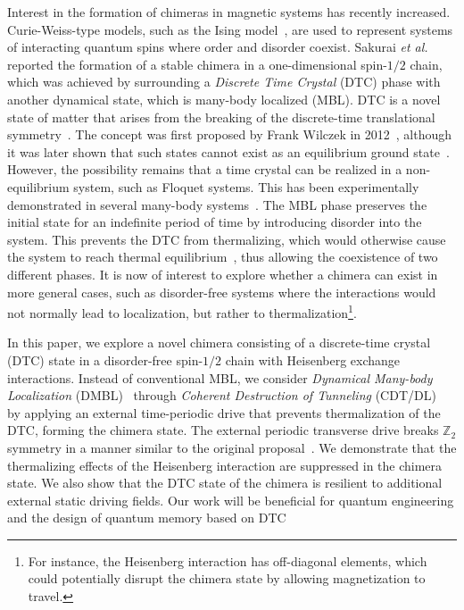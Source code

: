 \documentclass[12pt]{iopart}
\begin{document}
Interest in the formation of chimeras in magnetic systems has recently increased. Curie-Weiss-type models, such as the Ising model~\cite{singh_chimera_2011}, are used to represent systems of interacting quantum spins where order and disorder coexist. Sakurai \textit{et al.}~\cite{sakurai_phys_nodate} reported the formation of a stable chimera in a one-dimensional spin-$1/2$ chain, which was achieved by surrounding a \textit{Discrete Time Crystal} (DTC) phase with another dynamical state, which is many-body localized (MBL). DTC is a novel state of matter that arises from the breaking of the discrete-time translational symmetry~\cite{else_floquet_2016}. The concept was first proposed by Frank Wilczek in 2012~\cite{wilczek_quantum_2012}, although it was later shown that such states cannot exist as an equilibrium ground state~\cite{Bruno_comment_1, Bruno2013, watanabe_absence_2015}. However, the possibility remains that a time crystal can be realized in a non-equilibrium system, such as Floquet systems. This has been experimentally demonstrated in several many-body systems~\cite{huang2018,taheri_all-optical_2022, Soham2018, zhang_observation_2017, yao_time_2018,frey_realization_2022, rovny_observation_2018, sacha_time_nodate,golletz_basis_2022}. The MBL phase preserves the initial state for an indefinite period of time by introducing disorder into the system. This prevents the DTC from thermalizing, which would otherwise cause the system to reach thermal equilibrium~\cite{zhang_observation_2017,alet_many-body_2018,else_floquet_2016,smith_many-body_2016,nguyen_signature_2021}, thus allowing the coexistence of two different phases. It is now of interest to explore whether a chimera can exist in more general cases, such as disorder-free systems where the interactions would not normally lead to localization, but rather to thermalization\footnote{For instance, the Heisenberg interaction has off-diagonal elements, which could potentially disrupt the chimera state by allowing magnetization to travel.}.

In this paper, we explore a novel chimera consisting of a discrete-time crystal (DTC) state in a disorder-free spin-$1/2$ chain with Heisenberg exchange interactions. Instead of conventional MBL, we consider \textit{Dynamical Many-body Localization} (DMBL)~\cite{Keser2016, haldar_dynamical_2017,haldar_dynamical_2021,bhattacharyya_transverse_2012,aditya2023dynamical,dutta2014,das_exotic_2010} through \textit{Coherent Destruction of Tunneling} (CDT/DL)~\cite{Grossmann1991,Kayanuma2008} by applying an external time-periodic drive that prevents thermalization of the DTC, forming the chimera state. The external periodic transverse drive breaks $\mathbb{Z}_2$ symmetry in a manner similar to the original proposal~\cite{sakurai_phys_nodate}. We demonstrate that the thermalizing effects of the Heisenberg interaction are suppressed in the chimera state. We also show that the DTC state of the chimera is resilient to additional external static driving fields. Our work will be beneficial for quantum engineering and the design of quantum memory based on DTC~\cite{zhang_observation_2017}
\end{document}
